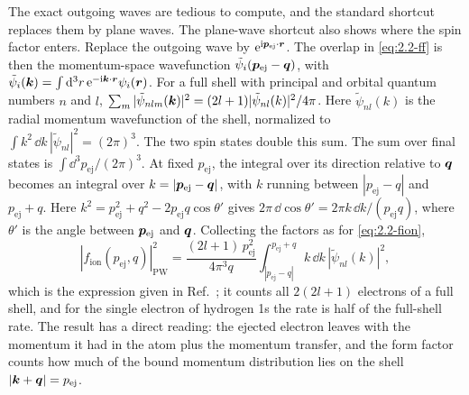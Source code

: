 The exact outgoing waves are tedious to compute, and the standard shortcut replaces them by plane waves. The plane-wave shortcut also shows where the spin factor enters. Replace the outgoing wave by $\mathrm{e}^{\mathrm{i}\bm{p}_{\mathrm{ej}}\cdot\bm{r}}$. The overlap in \cref{eq:2.2-ff} is then the momentum-space wavefunction $\tilde\psi_i(\bm{p}_{\mathrm{ej}} - \bm{q})$, with $\tilde\psi_i(\bm{k}) = \int\mathrm{d}^3r\,\mathrm{e}^{-\mathrm{i}\bm{k}\cdot\bm{r}}\psi_i(\bm{r})$. For a full shell with principal and orbital quantum numbers $n$ and $l$, $\sum_m|\tilde\psi_{nlm}(\bm{k})|^2 = (2l + 1)|\tilde\psi_{nl}(k)|^2/4\pi$. Here $\tilde\psi_{nl}(k)$ is the radial momentum wavefunction of the shell, normalized to $\int k^2\,\dd k\,|\tilde\psi_{nl}|^2 = (2\pi)^3$. The two spin states double this sum. The sum over final states is $\int\dd^3p_{\mathrm{ej}}/(2\pi)^3$. At fixed $p_{\mathrm{ej}}$, the integral over its direction relative to $\bm{q}$ becomes an integral over $k = |\bm{p}_{\mathrm{ej}} - \bm{q}|$, with $k$ running between $|p_{\mathrm{ej}} - q|$ and $p_{\mathrm{ej}} + q$. Here $k^2 = p_{\mathrm{ej}}^2 + q^2 - 2p_{\mathrm{ej}}q\cos\theta'$ gives $2\pi\,\dd\cos\theta' = 2\pi k\,\dd k/(p_{\mathrm{ej}}q)$, where $\theta'$ is the angle between $\bm{p}_{\mathrm{ej}}$ and $\bm{q}$. Collecting the factors as for \cref{eq:2.2-fion},
\begin{equation}
  |f_{\mathrm{ion}}(p_{\mathrm{ej}}, q)|^2_{\mathrm{PW}} = \frac{(2l + 1)\,p_{\mathrm{ej}}^2}{4\pi^3q}\int_{|p_{\mathrm{ej}} - q|}^{p_{\mathrm{ej}} + q}k\,\dd k\,|\tilde\psi_{nl}(k)|^2 ,
  \label{eq:2.2-fion-pw}
\end{equation}
which is the expression given in Ref.~\cite[text after Eq.~(6)]{essig2012direct}; it counts all $2(2l + 1)$ electrons of a full shell, and for the single electron of hydrogen 1s the rate is half of the full-shell rate. The result has a direct reading: the ejected electron leaves with the momentum it had in the atom plus the momentum transfer, and the form factor counts how much of the bound momentum distribution lies on the shell $|\bm{k} + \bm{q}| = p_{\mathrm{ej}}$.

